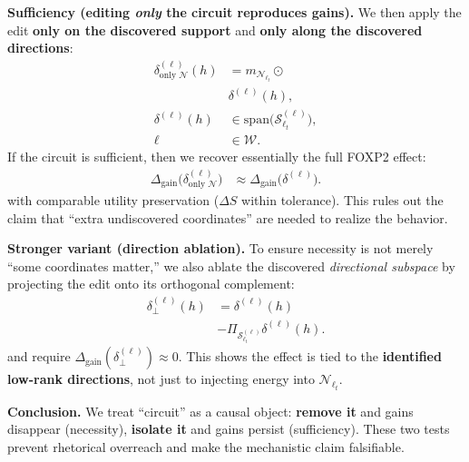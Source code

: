 \begin{itemize}[leftmargin=1.5em]
\begin{description}
\vspace{6pt}
\textbf{Sufficiency (editing \emph{only} the circuit reproduces gains).}
We then apply the edit \textbf{only on the discovered support} and \textbf{only along the discovered directions}:
\[
\begin{aligned}
\delta^{(\ell)}_{\text{only }\mathcal{N}}(h) &= m_{\mathcal{N}_{\ell_t}}\odot\\
&\delta^{(\ell)}(h),\\
\delta^{(\ell)}(h) &\in \mathrm{span}\!\big(\mathcal{S}^{(\ell)}_{\ell_t}\big),\\
\ell &\in\mathcal{W}.
\end{aligned}
\]
If the circuit is sufficient, then we recover essentially the full FOXP2 effect:
\[
\begin{aligned}
\Delta_{\mathrm{gain}}\big(\delta^{(\ell)}_{\text{only }\mathcal{N}}\big)
&\approx \Delta_{\mathrm{gain}}\big(\delta^{(\ell)}\big).
\end{aligned}
\]
with comparable utility preservation ($\Delta S$ within tolerance). This rules out the claim that “extra undiscovered coordinates” are needed to realize the behavior.

\vspace{6pt}
\textbf{Stronger variant (direction ablation).}
To ensure necessity is not merely “some coordinates matter,” we also ablate the discovered \emph{directional subspace} by projecting the edit onto its orthogonal complement:
\[
\begin{aligned}
\delta^{(\ell)}_{\perp}(h) &= \delta^{(\ell)}(h)\\
&-\Pi_{\mathcal{S}^{(\ell)}_{\ell_t}}\delta^{(\ell)}(h).
\end{aligned}
\]
and require $\Delta_{\mathrm{gain}}(\delta^{(\ell)}_{\perp})\approx 0$. This shows the effect is tied to the \textbf{identified low-rank directions}, not just to injecting energy into $\mathcal{N}_{\ell_t}$.

\vspace{4pt}
\textbf{Conclusion.} We treat “circuit” as a causal object: \textbf{remove it} and gains disappear (necessity), \textbf{isolate it} and gains persist (sufficiency). These two tests prevent rhetorical overreach and make the mechanistic claim falsifiable.
\end{description}










\end{itemize}
